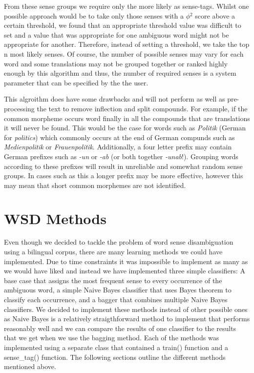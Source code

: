 \documentclass[a4wide,10pt]{article}
\begin{document}
From these sense groups we require only the more likely as sense-tags. 
Whilst one possible approach would be to take only those senses with a 
$\phi$$^2$ score above a certain threshold, we found that an appropriate 
threshold value was difficult to set and a value that was appropriate for 
one ambiguous word might not be appropriate for another. Therefore, instead 
of setting a threshold, we take the top n most likely senses. Of course, the
number of possible senses may vary for each word and some translations may 
not be grouped together or ranked highly enough by this algorithm and thus, 
the number of required senses is a system parameter that can be specified 
by the the user.       

This algroithm does have some drawbacks and will not perform as well as 
pre-processing the text to remove inflection and split compounds. For example,
if the common morpheme occurs word finally in all the compounds that are 
translations it will never be found. This would be the case for
words such as {\it Politik} (German for {\it politics}) which commonly occurs 
at the end of German compunds such as {\it Medienpolitik} or 
{\it Frauenpolitik}. Additionally, a four letter prefix may contain 
German prefixes such as {\it -un} or {\it -ab} (or both together 
{\it -unab}!). Grouping words according to these prefixes will result in
unreliable and somewhat random sense groups. In cases such as this a longer 
prefix may be more effective, however this may mean that short common  
morphemes are not identified.   


\section{WSD Methods}
Even though we decided to tackle the problem of word sense disambiguation
using a bilingual corpus, there are many learning methods we could have
implemented.
Due to time constraints it was impossible to implement as many as we would
have liked and instead we have implemented three simple classifiers:  A base
case that assigns the most frequent sense to every occurrence of the ambiguous
word, a simple Naive Bayes classifier that uses Bayes theorem to classify each
occurrence, and a bagger that combines multiple Naive Bayes classifiers.
We decided to implement these methods instead of other possible ones as
Naive Bayes is a relatively straigthforward method to implement that 
performs reasonably
well and we can compare the results of one classifier to the results that
we get when we use the bagging method.
Each of the methods was implemented using a separate class that contained
a train() function and a sense\_tag() function.
The following sections outline the different methods mentioned above.
\end{document}
